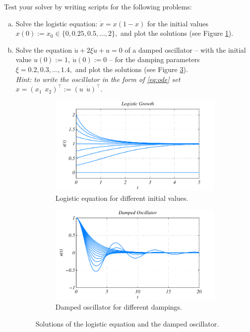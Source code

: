 \documentclass[a4paper, fleqn, 10pt]{report}
\theoremstyle{definition}
\begin{document}
Test your solver by writing scripts for the following problems:
\begin{enumerate}[a)]
\item Solve the logistic equation: $\dot x = x(1-x)$ for the initial values $x(0):=x_0\in\{0,0.25,0.5,\dots,2\},$
      and plot the solutions (see Figure \ref{fig:logistic}).
\item Solve the equation $\ddot u + 2\xi\dot u + u = 0$ of a damped oscillator -- with the initial value
$u(0) := 1,\: \dot u(0) := 0$ -- for the damping parameters $\xi =0.2,0.3,\dots,1.4,$
      and plot the solutions (see Figure \ref{fig:damped}).\\
      {\it \small Hint: to write the oscillator in the form of \eqref{eq:ode} set $x=(x_1\ \ x_2)^\top:=(u\ \ \dot u)^\top.$}
      \begin{figure}[ht!]
	\centering
	\begin{subfigure}[b]{0.48\textwidth}
	  \includegraphics[width=\textwidth]{logistic}
	  \caption{Logistic equation for different initial values.}
	  \label{fig:logistic}
	\end{subfigure}
	\begin{subfigure}[b]{0.48\textwidth}
	 \includegraphics[width=\textwidth]{damped}
	 \caption{Damped oscillator for different dampings.}
	  \label{fig:damped}
	\end{subfigure}
	\caption{Solutions of the logistic equation and the damped oscillator.}
      \end{figure}


\end{enumerate}
\end{document}
